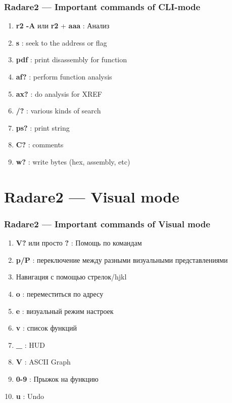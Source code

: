 \documentclass[10pt,pdf,utf8,english,compress,hyperref={unicode}]{beamer}
\begin{document}
\begin{frame}[fragile]
  \frametitle{Radare2 — Important commands of CLI-mode}
  \begin{enumerate}
   \item \alert{\bf{r2 -A}} или \alert{\bf{r2}} + \alert{\bf{aaa}} : Анализ
   \item \alert{\bf{s}} : seek to the address or flag
   \item \alert{\bf{pdf}} : print disassembly for function
   \item \alert{\bf{af?}} : perform function analysis
   \item \alert{\bf{ax?}} : do analysis for XREF
   \item \alert{\bf{/?}} : various kinds of search
   \item \alert{\bf{ps?}} : print string
   \item \alert{\bf{C?}} : comments
   \item \alert{\bf{w?}} : write bytes (hex, assembly, etc)
 \end{enumerate}
\end{frame}

\section{Radare2 — Visual mode}
\begin{frame}[fragile]
  \frametitle{Radare2 — Important commands of Visual mode}
  \begin{enumerate}
  \item \alert{\bf{V?}} или просто \alert{\bf{?}} : Помощь по командам
  \item \alert{\bf{p/P}} : переключение между разными визуальными представлениями
  \item Навигация с помощью стрелок/hjkl
  \item \alert{\bf{o}} : переместиться по адресу
  \item \alert{\bf{e}} : визуальный режим настроек
  \item \alert{\bf{v}} : список функций
  \item \alert{\bf{\_}} : HUD
  \item \alert{\bf{V}} : ASCII Graph
  \item \alert{\bf{0-9}} : Прыжок на функцию
  \item \alert{\bf{u}} : Undo
 \end{enumerate}
\end{frame}
\end{document}
